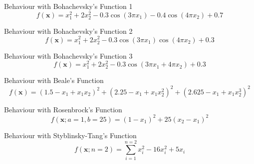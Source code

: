 \documentclass[10pt]{beamer}
\newcommand{\xbold}{\mathbf{x}}
\begin{document}
\begin{frame}{Behaviour with Bohachevsky's Function 1}
\begin{equation}
\label{B1}
f(\xbold) = x_{1}^{2} + 2x_{2}^{2} - 0.3\cos(3\pi x_{1}) - 0.4\cos(4\pi x_{2}) + 0.7
\end{equation}
\end{frame}

\begin{frame}{Behaviour with Bohachevsky's Function 2}
\begin{equation}
\label{B2}
f(\xbold) = x_{1}^{2} + 2x_{2}^{2} - 0.3\cos(3\pi x_{1})\cos(4\pi x_{2}) + 0.3
\end{equation}
\end{frame}

\begin{frame}{Behaviour with Bohachevsky's Function 3}
\begin{equation}
\label{B3}
f(\xbold) = x_{1}^{2} + 2x_{2}^{2} - 0.3\cos(3\pi x_{1} + 4\pi x_{2}) + 0.3
\end{equation}
\end{frame}

\begin{frame}{Behaviour with Beale's Function}
\begin{equation}
\label{BL}
f(\xbold) = (1.5 - x_{1} + x_{1}x_{2})^{2} + (2.25 - x_{1} + x_{1}x_{2}^{2})^{2} + (2.625 - x_{1} + x_{1}x_{2}^{3})^{2}
\end{equation}
\end{frame}

\begin{frame}{Behaviour with Rosenbrock's Function}
\begin{equation}
\label{RB}
f(\xbold;a=1, b=25) = (1 - x_{1})^{2} + 25(x_{2} - x_{1})^{2}
\end{equation}
\end{frame}

\begin{frame}{Behaviour with Styblinsky-Tang's Function}
\begin{equation}
\label{ST}
\displaystyle f(\xbold;n=2) = \sum_{i=1}^{n=2} x_{i}^{2} - 16x_{i}^{2} + 5x_{i}
\end{equation}
\end{frame}
\end{document}

